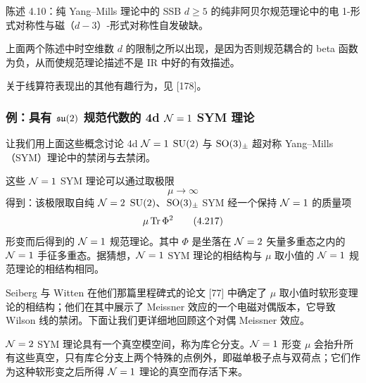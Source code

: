 
\begin{statementbox}{陈述 4.10：纯 Yang--Mills 理论中的 SSB}
$d\ge 5$ 的纯非阿贝尔规范理论中的电 1-形式对称性与磁（$d-3$）-形式对称性自发破缺。
\end{statementbox}

上面两个陈述中时空维数 $d$ 的限制之所以出现，是因为否则规范耦合的 beta 函数为负，从而使规范理论描述不是 IR 中好的有效描述。

关于线算符表现出的其他有趣行为，见 [178]。

\subsubsection{例：具有 $\mathfrak{su}(2)$ 规范代数的 4d $\mathcal{N}=1$ SYM 理论}


让我们用上面这些概念讨论 4d $\mathcal{N}=1$ $\mathrm{SU}(2)$ 与 $\mathrm{SO}(3)_\pm$ 超对称 Yang--Mills（SYM）理论中的禁闭与去禁闭。


这些 $\mathcal{N}=1$ SYM 理论可以通过取极限
\begin{equation}
  \mu\to\infty \tag{4.216}
\end{equation}
得到：该极限取自纯 $\mathcal{N}=2$ $\mathrm{SU}(2)$、$\mathrm{SO}(3)_\pm$ SYM 经一个保持 $\mathcal{N}=1$ 的质量项
\begin{equation}
  \mu\operatorname{Tr}\Phi^2 \tag{4.217}
\end{equation}
形变而后得到的 $\mathcal{N}=1$ 规范理论。其中 $\Phi$ 是坐落在 $\mathcal{N}=2$ 矢量多重态之内的 $\mathcal{N}=1$ 手征多重态。据猜想，$\mathcal{N}=1$ SYM 理论的相结构与 $\mu$ 取小值的 $\mathcal{N}=1$ 规范理论的相结构相同。


Seiberg 与 Witten 在他们那篇里程碑式的论文 [77] 中确定了 $\mu$ 取小值时软形变理论的相结构；他们在其中展示了 Meissner 效应的一个电磁对偶版本，它导致 Wilson 线的禁闭。下面让我们更详细地回顾这个对偶 Meissner 效应。


$\mathcal{N}=2$ SYM 理论具有一个真空模空间，称为库仑分支。$\mathcal{N}=1$ 形变 $\mu$ 会抬升所有这些真空，只有库仑分支上两个特殊的点例外，即磁单极子点与双荷点；它们作为这种软形变之后所得 $\mathcal{N}=1$ 理论的真空而存活下来。

